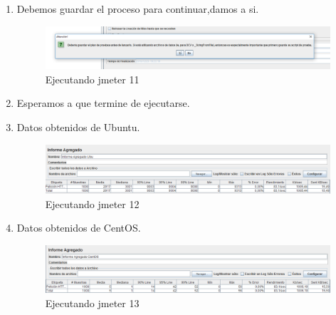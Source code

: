 \begin{enumerate}
	\item Debemos guardar el proceso para continuar,damos a si.
	
	\begin{figure}[H] %
		\centering
		\includegraphics[scale=0.4]{pics/11}  %
		\caption{Ejecutando jmeter 11} \label{fig:jmt11}
	\end{figure}

	\item Esperamos a que termine de ejecutarse.

	\item Datos obtenidos de Ubuntu.

	\begin{figure}[H] %
		\centering
		\includegraphics[scale=0.5]{pics/12}  %
		\caption{Ejecutando jmeter 12} \label{fig:jmt12}
	\end{figure}

	\item Datos obtenidos de CentOS.

	\begin{figure}[H] %
		\centering
		\includegraphics[scale=0.5]{pics/13}  %
		\caption{Ejecutando jmeter 13} \label{fig:jmt13}
	\end{figure}


\end{enumerate}
